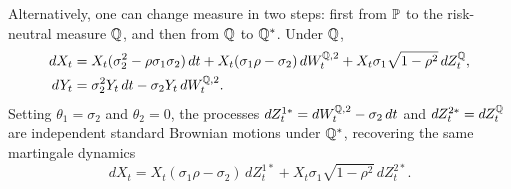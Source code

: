 \begin{note}
    Alternatively, one can change measure in two steps: first from $\mathbb{P}$ to the risk-neutral measure $\mathbb{Q}$, and then from $\mathbb{Q}$ to $\mathbb{Q}^*$. Under $\mathbb{Q}$,
    \begin{align*}
        dX_t &= X_t(\sigma_2^2 - \rho\sigma_1\sigma_2)\,dt + X_t(\sigma_1\rho - \sigma_2)\,dW_t^{\mathbb{Q},2} + X_t\sigma_1\sqrt{1 - \rho^2}\,dZ_t^{\mathbb{Q}}, \\
        dY_t &= \sigma_2^2 Y_t\,dt - \sigma_2 Y_t\,dW_t^{\mathbb{Q},2}.
    \end{align*}
    Setting $\theta_1 = \sigma_2$ and $\theta_2 = 0$, the processes $dZ_t^{1*} = dW_t^{\mathbb{Q},2} - \sigma_2\,dt$ and $dZ_t^{2*} = dZ_t^{\mathbb{Q}}$ are independent standard Brownian motions under $\mathbb{Q}^*$, recovering the same martingale dynamics
    \[
        dX_t = X_t(\sigma_1\rho - \sigma_2)\,dZ_t^{1*} + X_t\sigma_1\sqrt{1 - \rho^2}\,dZ_t^{2*}.
    \]
\end{note}

